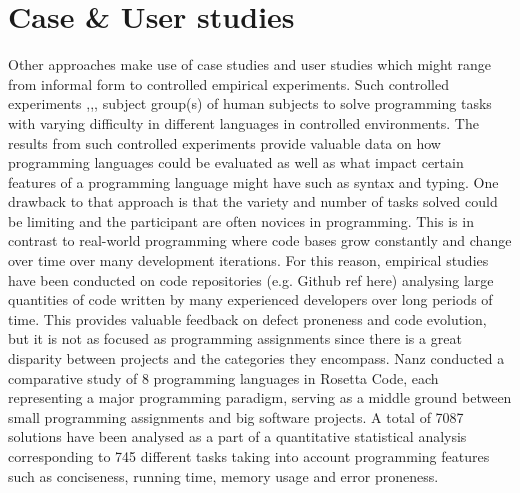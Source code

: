 \section{Case \& User studies}
Other approaches make use of case studies and user studies which might range from informal form to controlled empirical experiments. Such controlled experiments \cite{DynamicTypeSystems},\cite{MulticoreLangs},\cite{EmpiricalComparison}, \cite{Empiricalinvestigation} subject group(s) of human subjects to solve programming tasks with varying difficulty in different languages in controlled environments. The results from such controlled experiments provide valuable data on how programming languages could be evaluated as well as what impact certain features of a programming language might have such as syntax and typing. One drawback to that approach is that the variety and number of tasks solved could be limiting and the participant are often novices in programming. This is in contrast to real-world programming where code bases grow constantly and change over time over many development iterations. For this reason, empirical studies have been conducted on code repositories (e.g. Github \todo ref here) analysing large quantities of code written by many experienced developers  over long periods of time. This provides valuable feedback on defect proneness and code evolution, but it is not as focused as programming assignments since there is a great disparity between projects and the categories they encompass. Nanz \cite{RosettaCode} conducted a comparative study of 8 programming languages in Rosetta Code, each representing a major programming paradigm, serving as a middle ground between small programming assignments and big software projects. A total of 7087 solutions have been analysed as a part of a quantitative statistical analysis corresponding to 745 different tasks taking into account programming features such as conciseness, running time, memory usage and error proneness.